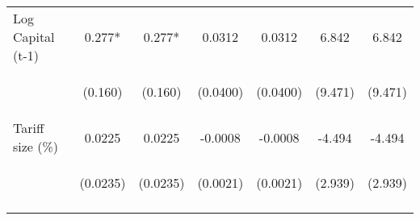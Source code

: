 \documentclass{article}
\begin{document}
\begin{table}[htbp]
{\begin{tabular}{lcccccc}
Log Capital (t-1) & 0.277* & 0.277* & 0.0312 & 0.0312 & 6.842 & 6.842 \\
\vspace{4pt} & \begin{footnotesize}(0.160)\end{footnotesize} & \begin{footnotesize}(0.160)\end{footnotesize} & \begin{footnotesize}(0.0400)\end{footnotesize} & \begin{footnotesize}(0.0400)\end{footnotesize} & \begin{footnotesize}(9.471)\end{footnotesize} & \begin{footnotesize}(9.471)\end{footnotesize} \\
Tariff size (\%) & 0.0225 & 0.0225 & -0.0008 & -0.0008 & -4.494 & -4.494 \\
 & \begin{footnotesize}(0.0235)\end{footnotesize} & \begin{footnotesize}(0.0235)\end{footnotesize} & \begin{footnotesize}(0.0021)\end{footnotesize} & \begin{footnotesize}(0.0021)\end{footnotesize} & \begin{footnotesize}(2.939)\end{footnotesize} & \begin{footnotesize}(2.939)\end{footnotesize} \\
\vspace{4pt} & \begin{footnotesize}\end{footnotesize} & \begin{footnotesize}\end{footnotesize} & \begin{footnotesize}\end{footnotesize} & \begin{footnotesize}\end{footnotesize} & \begin{footnotesize}\end{footnotesize} & \begin{footnotesize}\end{footnotesize} \\ 

\end{tabular}}
\end{table}
\end{document}
